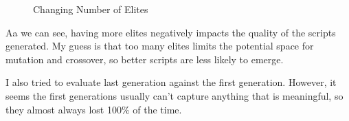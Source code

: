 \documentclass[]{article}
\begin{document}
\begin{figure}[H]%
  \centering
  \qquad
  \qquad
  \caption{Changing Number of Elites}%
  \label{fig:example}%
\end{figure}

Aa we can see, having more elites negatively impacts the quality of the
scripts generated. My guess is that too many elites limits the potential
space for mutation and crossover, so better scripts are less likely to
emerge.

I also tried to evaluate last generation against the first generation.
However, it seems the first generations usually can't capture anything that is meaningful, so they almost always lost 100\% of the time.
\end{document}
